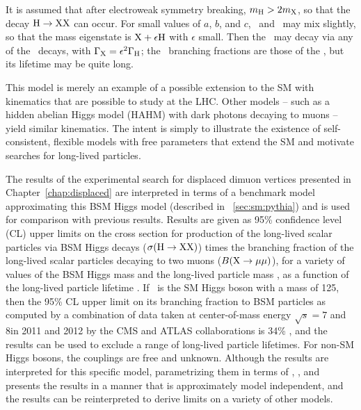 It is assumed that after electroweak symmetry breaking, $m_{\mathrm{H}} > 2m_{\mathrm{X}}$, so that the decay $\mathrm{H} \to \mathrm{X}\mathrm{X}$ can occur.
For small values of $a$, $b$, and $c$, \PLLP\ and \PHiggs\ may mix slightly, so that the mass eigenstate is $\mathrm{X} + \epsilon \mathrm{H}$ with $\epsilon$ small.
Then the \PLLP\ may decay via any of the \PHiggs\ decays, with $\Gamma_{\mathrm{X}} = \epsilon^2 \Gamma_{\mathrm{H}}$; the \PLLP\ branching fractions are those of the \PHiggs, but its lifetime may be quite long.

This model is merely an example of a possible extension to the SM with kinematics that are possible to study at the LHC.
Other models -- such as a hidden abelian Higgs model (HAHM) with dark photons decaying to muons \cite{Curtin2015} -- yield similar kinematics.
The intent is simply to illustrate the existence of self-consistent, flexible models with free parameters that extend the SM and motivate searches for long-lived particles.

The results of the experimental search for displaced dimuon vertices presented in Chapter~\ref{chap:displaced} are interpreted in terms of a benchmark model approximating this BSM Higgs model (described in \Sec~\ref{sec:sm:pythia}) and is used for comparison with previous results.
Results are given as 95\% confidence level (CL) upper limits on the cross section for production of the long-lived scalar particles via BSM Higgs decays ($\sigma(\mathrm{H}\to \mathrm{X}\mathrm{X})$) times the branching fraction of the long-lived scalar particles decaying to two muons ($B(\mathrm{X}\to\mathrm{\mu}\mathrm{\mu})$), for a variety of values of the BSM Higgs mass \mH and the long-lived particle mass \mX, as a function of the long-lived particle lifetime \cTau.
If \PHiggs\ is the SM Higgs boson with a mass of 125\GeV, then the 95\% CL upper limit on its branching fraction to BSM particles as computed by a combination of data taken at center-of-mass energy $\sqrt{s} = 7$ and 8\TeV in 2011 and 2012 by the CMS and ATLAS collaborations is 34\% \cite{Aad2016}, and the results can be used to exclude a range of long-lived particle lifetimes.
For non-SM Higgs bosons, the couplings are free and unknown.
Although the results are interpreted for this specific model, parametrizing them in terms of \mH, \mX, and \cTau presents the results in a manner that is approximately model independent, and the results can be reinterpreted to derive limits on a variety of other models.


